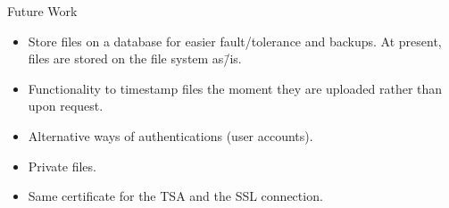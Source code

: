 \documentclass[xcolor={svgnames, table}, usepdftitle=false]{beamer}
\begin{document}
\begin{frame}{Future Work}
  \begin{itemize}
  \item Store files on a database for easier fault\-/tolerance and
    backups.  At present, files are stored on the file system as\=/is.
  \item Functionality to timestamp files the moment they are uploaded
    rather than upon request.
  \item Alternative ways of authentications (user accounts).
  \item Private files.
  \item Same certificate for the TSA and the SSL connection.
  \end{itemize}
\end{frame}
\end{document}
